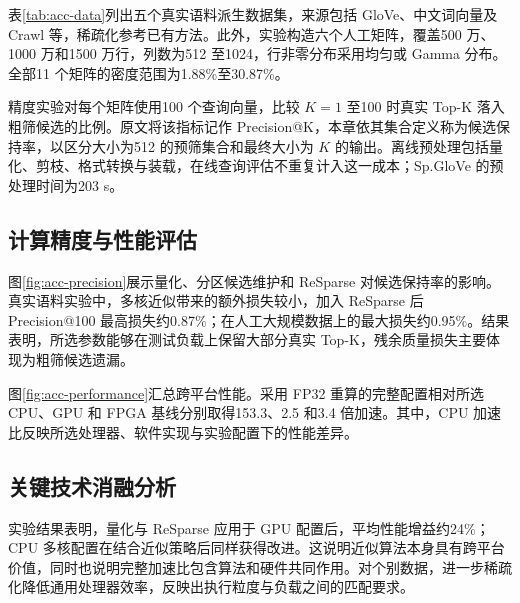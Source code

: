 表\ref{tab:acc-data}列出五个真实语料派生数据集，来源包括 GloVe、中文词向量及 Crawl 等\cite{glove_2014,baidu_encyclopedia_2018,cc_zh_2018,crawl_2018}，稀疏化参考已有方法\cite{sparse_2015}。此外，实验构造六个人工矩阵，覆盖500 万、1000 万和1500 万行，列数为512 至1024，行非零分布采用均匀或 Gamma 分布。全部11 个矩阵的密度范围为1.88\%至30.87\%。

精度实验对每个矩阵使用100 个查询向量，比较 $K=1$ 至100 时真实 Top-K 落入粗筛候选的比例。原文将该指标记作 Precision@K，本章依其集合定义称为候选保持率，以区分大小为512 的预筛集合和最终大小为 $K$ 的输出。离线预处理包括量化、剪枝、格式转换与装载，在线查询评估不重复计入这一成本；Sp.GloVe 的预处理时间为203 s。

\subsection{计算精度与性能评估}
图\ref{fig:acc-precision}展示量化、分区候选维护和 ReSparse 对候选保持率的影响。真实语料实验中，多核近似带来的额外损失较小，加入 ReSparse 后 Precision@100 最高损失约0.87\%；在人工大规模数据上的最大损失约0.95\%。结果表明，所选参数能够在测试负载上保留大部分真实 Top-K，残余质量损失主要体现为粗筛候选遗漏。


图\ref{fig:acc-performance}汇总跨平台性能。采用 FP32 重算的完整配置相对所选 CPU、GPU 和 FPGA 基线分别取得153.3、2.5 和3.4 倍加速。其中，CPU 加速比反映所选处理器、软件实现与实验配置下的性能差异。


\subsection{关键技术消融分析}
实验结果表明，量化与 ReSparse 应用于 GPU 配置后，平均性能增益约24\%；CPU 多核配置在结合近似策略后同样获得改进。这说明近似算法本身具有跨平台价值，同时也说明完整加速比包含算法和硬件共同作用。对个别数据，进一步稀疏化降低通用处理器效率，反映出执行粒度与负载之间的匹配要求。

